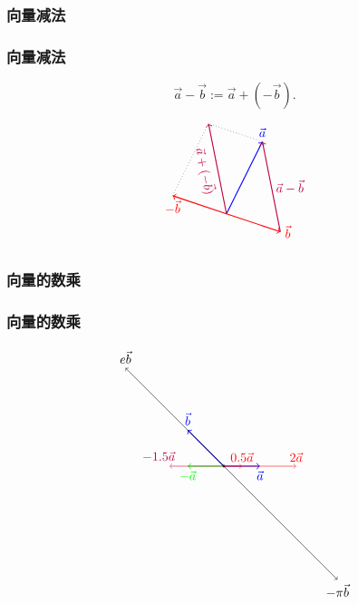 \subsubsection{向量减法}
\begin{frame}\frametitle{向量减法}
\begin{definition}[向量的减法]
\[\vec{a}-\vec{b}:=\vec{a}+(-\vec{b}).\]
\end{definition}

\pp

\begin{equation*}
\begin{tikzpicture}[scale=1]
\coordinate (O) at (0,0);
\coordinate (A) at (1,2);
\coordinate (B) at (1.5,-0.5);
\coordinate (b) at (-1.5,0.5);
\coordinate (C) at (-0.5,2.5);
\pp
\draw[->,thick,blue](O)--(A) node[pos=1,above] {$\vec{a}$};
\draw[->,thick,red](O)--(B) node[pos=1,right] {$\vec{b}$};
\pp
\draw[->,thick,red](O)--(b) node[pos=1,below] {$-\vec{b}$};
\pp
\draw[dotted](A)--(C)--(b);
\pp
\draw[->,thick,purple](O)--(C) node[pos=0.5,sloped,below] {$\vec{a}+(-\vec{b})$};
\pp
\draw[->,thick,purple](B)--(A) node[pos=0.5,right] {$\vec{a}-\vec{b}$};
\end{tikzpicture}
\end{equation*}


\end{frame}





\subsubsection{向量的数乘}
\begin{frame}\frametitle{向量的数乘}
\begin{equation*}
\begin{tikzpicture}[scale=1]
\coordinate (O) at (0,0);\draw [fill] (O) circle [radius=0.03];
\coordinate (A) at (1,0);
\coordinate (05A) at (0.5*1,0);
\coordinate (2A) at (2*1,0);
\coordinate (mA) at (-1*1,0);
\coordinate (m15A) at (-1.5*1,0);
\coordinate (B) at (-1,1);
\coordinate (mpiB) at (3.14,-3.14);
\coordinate (eB) at (-2.718,2.718);
\draw[->,thick,blue](O)--(A) node[pos=1,sloped,below] {$\vec{a}$};
\pp
\draw[->,red](O)--(05A) node[pos=1,sloped,above] {$0.5\vec{a}$};
\pp
\draw[->,red](O)--(2A) node[pos=1,sloped,above] {$2\vec{a}$};
\pp
\draw[->,thick,green](O)--(mA) node[pos=1,sloped,below] {$-\vec{a}$};
\pp
\draw[->,purple](O)--(m15A) node[pos=1.2,sloped,above] {$-1.5\vec{a}$};
\pp
\draw[->,thick,blue](O)--(B) node[pos=1,above] {$\vec{b}$};
\draw[->,black](O)--(mpiB) node[pos=1,below] {$-\pi\vec{b}$};
\draw[->,black](O)--(eB) node[pos=1,above] {$e\vec{b}$};
\pp
\end{tikzpicture}
\end{equation*}
\end{frame}






